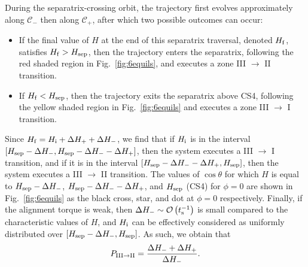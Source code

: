 \documentclass[
        fleqn,
        usenatbib,
    ]{mnras}
\newcommand*{\p}[1]{\left(#1\right)}
\newcommand*{\s}[1]{\left[#1\right]}
\begin{document}
During the separatrix-crossing orbit, the trajectory first evolves
approximately along $\mathcal{C}_-$ then along $\mathcal{C}_+$, after which two
possible outcomes can occur:
\begin{itemize}
    \item If the final value of $H$ at the end of this separatrix traversal,
        denoted $H_{\rm f}$, satisfies $H_{\rm f} > H_{\rm sep}$, then the
        trajectory enters the separatrix, following the red shaded region in
        Fig.~\ref{fig:6equils}, and executes a zone III $\to$ II transition.

    \item If $H_{\rm f} < H_{\rm sep}$, then the trajectory exits the separatrix
        above CS4, following the yellow shaded region in Fig.~\ref{fig:6equils}
        and executes a zone III $\to$ I transition.
\end{itemize}
Since $H_{\rm f} = H_{\rm i} + \Delta H_+ + \Delta H_-$, we find that if $H_{\rm
i}$ is in the interval $\s{H_{\rm sep} - \Delta H_-, H_{\rm sep} - \Delta H_{-}
- \Delta H_+}$, then the system executes a III $\to$ I transition, and if it
is in the interval $\s{H_{\rm sep} - \Delta H_- - \Delta H_+, H_{\rm sep}}$,
then the system executes a III $\to$ II transition. The values of $\cos
\theta$ for which $H$ is equal to $H_{\rm sep} - \Delta H_-$, $H_{\rm sep} - \Delta
H_- - \Delta H_+$, and $H_{\rm sep}$ (CS4) for $\phi = 0$ are shown in
Fig.~\ref{fig:6equils} as the black cross, star, and dot at $\phi = 0$
respectively. Finally, if the alignment torque is weak, then $\Delta H_- \sim
\mathcal{O}\p{t_{\rm s}^{-1}}$ is small compared to the characteristic values of
$H$, and $H_{\rm i}$ can be effectively considered as uniformly distributed over
$\s{H_{\rm sep} - \Delta H_-, H_{\rm sep}}$. As such, we obtain that
\begin{equation}
    P_{\rm III \to II} = \frac{\Delta H_- + \Delta H_+}{\Delta H_-}.
        \label{eq:def_P32_toy}
\end{equation}
\end{document}
